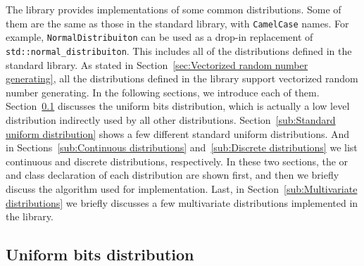 The library provides implementations of some common distributions. Some of them
are the same as those in the standard library, with \verb|CamelCase| names. For
example, \verb|NormalDistribuiton| can be used as a drop-in replacement of
\verb|std::normal_distribuiton|. This includes all of the distributions defined
in the standard library. As stated in Section~\ref{sec:Vectorized random number
  generating}, all the distributions defined in the library support vectorized
random number generating. In the following sections, we introduce each
of them. Section~\ref{sub:Uniform bits distribution} discusses the uniform bits
distribution, which is actually a low level distribution indirectly used by all
other distributions. Section~\ref{sub:Standard uniform distribution} shows a
few different standard uniform distributions. And in
Sections~\ref{sub:Continuous distributions} and~\ref{sub:Discrete
  distributions} we list continuous and discrete distributions, respectively.
In these two sections, the \pdf or \pmf and class declaration of each
distribution are shown first, and then we briefly discuss the algorithm used
for implementation. Last, in Section~\ref{sub:Multivariate distributions} we
briefly discusses a few multivariate distributions implemented in the library.

\subsection{Uniform bits distribution}
\label{sub:Uniform bits distribution}

